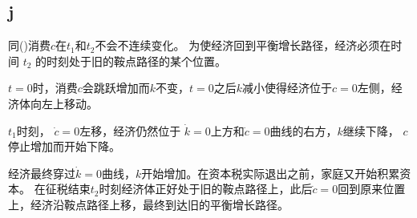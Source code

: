 \documentclass[a4paper,12pt]{ctexart}
\begin{document}
\subsection*{j}
同()消费$c$在$t_1$和$t_2$不会不连续变化。
为使经济回到平衡增长路径，经济必须在时间 $t_2$ 的时刻处于旧的鞍点路径的某个位置。

$t=0$时，消费$c$会跳跃增加而$k$不变，$t=0$之后$k$减小使得经济位于$c=0$左侧，经济体向左上移动。

$t_1$时刻， $\dot c=0$左移，经济仍然位于 $\dot k=0$上方和$\dot c=0$曲线的右方，$k$继续下降， $c$停止增加而开始下降。

经济最终穿过$\dot k=0$曲线，$k$开始增加。在资本税实际退出之前，家庭又开始积累资本。 在征税结束$t_2$时刻经济体正好处于旧的鞍点路径上，此后$\dot c=0$回到原来位置上，经济沿鞍点路径上移，最终到达旧的平衡增长路径。
\end{document}
